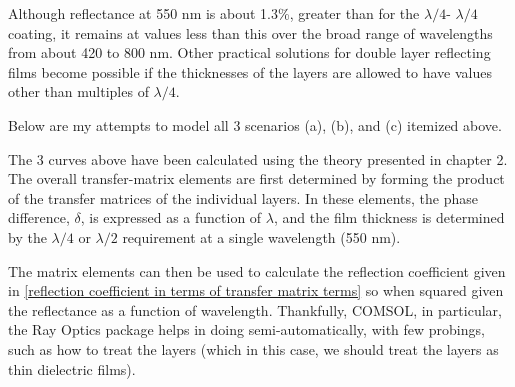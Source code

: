 Although reflectance at 550 nm is about 1.3\%, greater than for the $\lambda/4$- $\lambda/4$ coating, it remains at values less than this over the broad range of wavelengths from about 420 to 800 nm. Other practical solutions for double layer reflecting films become possible if the thicknesses of the layers are allowed to have values other than multiples of $\lambda/4$.

Below are my attempts to model all 3 scenarios (a), (b), and (c) itemized above.







The 3 curves above have been calculated using the theory presented in chapter 2. The overall transfer-matrix elements are first determined by forming the product of the transfer matrices of the individual layers. In these elements, the phase difference, $\delta$, is expressed as a function of $\lambda$, and the film thickness is determined by the $\lambda/4$ or $\lambda/2$ requirement at a single wavelength (550 nm).

The matrix elements can then be used to calculate the reflection coefficient given in \ref{reflection coefficient in terms of transfer matrix terms} so when squared given the reflectance as a function of wavelength. Thankfully, COMSOL, in particular, the Ray Optics package helps in doing semi-automatically, with few probings, such as how to treat the layers (which in this case, we should treat the layers as thin dielectric films).